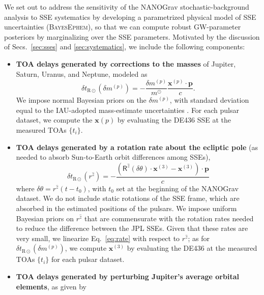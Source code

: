 \documentclass[reprint,
 amsmath,amssymb,
 aps,prd,floatfix,
]{revtex4-1}
\begin{document}
We set out to address the sensitivity of the NANOGrav stochastic-background analysis to SSE systematics by developing a parametrized physical model of SSE uncertainties (\textsc{BayesEphem}), so that we can compute robust GW-parameter posteriors by marginalizing over the SSE parameters. 
Motivated by the discussion of Secs.\ \ref{sec:sses} and \ref{sec:systematics}, we include the following components:
%
\begin{itemize}[leftmargin=*]
%
\item \textbf{TOA delays generated by corrections to the masses} of Jupiter, Saturn, Uranus, and Neptune, modeled as \cite{2010ApJ...720L.201C}
%
\begin{equation}
\label{eq:massperturb}
    \delta t_{\mathrm{R}\odot}(\delta m^{(p)}) = -\frac{\delta m^{(p)}}{m^\odot} \frac{\mathbf{x}^{(p)} \cdot \mathbf{p}}{c}.
\end{equation}
%
We impose normal Bayesian priors on the $\delta m^{(p)}$, with standard deviation equal to the IAU-adopted mass-estimate uncertainties \cite{iaumasses}. For each pulsar dataset, we compute the $\mathbf{x}(p)$ by evaluating the DE436 SSE at the measured TOAs $\{t_i\}$.
%
\item \textbf{TOA delays generated by a rotation rate about the ecliptic pole} (as needed to absorb Sun-to-Earth orbit differences among SSEs),
\begin{equation}
\label{eq:rate}
    \delta t_{\mathrm{R}\odot}(r^{\hat{z}}) =
    -\frac{(\mathsf{R}^{\hat{z}}(\delta \theta) \cdot \mathbf{x}^{(3)} - \mathbf{x}^{(3)}) \cdot \mathbf{p}}{c} 
\end{equation}
%
where $\delta \theta = r^{\hat{z}} (t - t_0)$, with $t_0$ set at the beginning of the NANOGrav dataset.
We do not include static rotations of the SSE frame, which are absorbed in the estimated positions of the pulsars.
We impose uniform Bayesian priors on $r^{\hat{z}}$ that are commensurate with the rotation rates needed to reduce the difference between the JPL SSEs. 
Given that these rates are very small, we linearize Eq.\ \eqref{eq:rate} with respect to $r^{\hat{z}}$; as for $\delta t_{\mathrm{R}\odot}(\delta m^{(p)})$, we compute $\mathbf{x}^{(3)}$ by evaluating the DE436 at the measured TOAs $\{t_i\}$ for each pulsar dataset.
%
\item \textbf{TOA delays generated by perturbing Jupiter's average orbital elements}, as given by
\begin{equation}

\end{equation}
\end{itemize}
\end{document}
